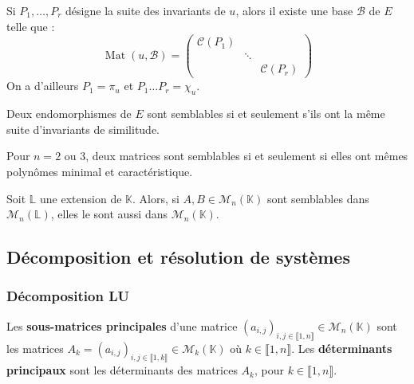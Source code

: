 	\begin{theorem}
		Si $P_1, \dots, P_r$ désigne la suite des invariants de $u$, alors il existe une base $\mathcal{B}$ de $E$ telle que :
		\[ \operatorname{Mat}(u, \mathcal{B}) = \begin{pmatrix} \mathcal{C}(P_1) & & \\ & \ddots & \\ & & \mathcal{C}(P_r) \end{pmatrix} \]
		On a d'ailleurs $P_1 = \pi_u$ et $P_1 \dots P_r = \chi_u$.
	\end{theorem}
	
	\begin{corollary}
		Deux endomorphismes de $E$ sont semblables si et seulement s'ils ont la même suite d'invariants de similitude.
	\end{corollary}
	
	\begin{application}
		Pour $n = 2$ ou $3$, deux matrices sont semblables si et seulement si elles ont mêmes polynômes minimal et caractéristique.
	\end{application}
	
	\begin{application}
		Soit $\mathbb{L}$ une extension de $\mathbb{K}$. Alors, si $A, B \in \mathcal{M}_n(\mathbb{K})$ sont semblables dans $\mathcal{M}_n(\mathbb{L})$, elles le sont aussi dans $\mathcal{M}_n(\mathbb{K})$.
	\end{application}
	
	\subsection{Décomposition et résolution de systèmes}
	
	\subsubsection{Décomposition LU}
	
	
	\begin{definition}
		Les \textbf{sous-matrices principales} d'une matrice $(a_{i,j})_{i,j \in \llbracket 1, n \rrbracket} \in \mathcal{M}_n(\mathbb{K})$ sont les matrices $A_k = (a_{i,j})_{i,j \in \llbracket 1, k \rrbracket} \in \mathcal{M}_k(\mathbb{K})$ où $k \in \llbracket 1, n \rrbracket$. Les \textbf{déterminants principaux} sont les déterminants des matrices $A_k$, pour $k \in \llbracket 1, n \rrbracket$.
	\end{definition}
	
